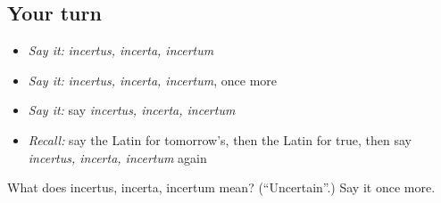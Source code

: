 \subsection*{Your turn}
\begin{itemize}
\raggedright
  \item \emph{Say it:} \emph{incertus, incerta, incertum}
  \item \emph{Say it:} \emph{incertus, incerta, incertum}, once more
  \item \emph{Say it:} say \emph{incertus, incerta, incertum}
  \item \emph{Recall:} say the Latin for tomorrow's, then the Latin for true, then say \emph{incertus, incerta, incertum} again
\end{itemize}

\begin{tcolorbox}[breakable,colback=teal!4,colframe=teal!35!black,title={Before you move on}]
What does incertus, incerta, incertum mean? (\textquotedblleft{}Uncertain\textquotedblright{}.) Say it once more.
\end{tcolorbox}
